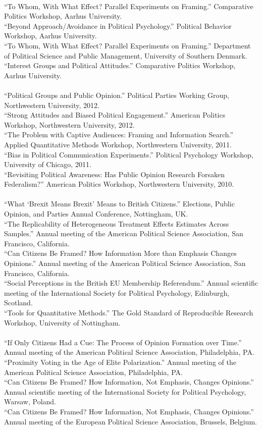 \documentclass[12pt]{article}
\newcommand{\topic}[1]{\pagebreak[3]\indent {\color{lg}{\footnotesize #1 }}\\}
\newcommand{\entry}[1]{\indent {\color{lg}\guillemotright}\hspace{2pt}#1\vspace{.25em}\\}
\begin{document}
{	\topic{Invited Presentations (2013)}
	\entry{``To Whom, With What Effect? Parallel Experiments on Framing.'' Comparative Politics Workshop, Aarhus University.}
	\entry{``Beyond Approach/Avoidance in Political Psychology.'' Political Behavior Workshop, Aarhus University.}
	\entry{``To Whom, With What Effect? Parallel Experiments on Framing.'' Department of Political Science and Public Management, University of Southern Denmark.}
	\entry{``Interest Groups and Political Attitudes.'' Comparative Politics Workshop, Aarhus University.}
	
	\topic{Invited Presentations (2012 and earlier)}
	\entry{``Political Groups and Public Opinion.'' Political Parties Working Group, Northwestern University, 2012.}
	\entry{``Strong Attitudes and Biased Political Engagement.'' American Politics Workshop, Northwestern University, 2012.}
	\entry{``The Problem with Captive Audiences: Framing and Information Search.'' Applied Quantitative Methods Workshop, Northwestern University, 2011.}
	\entry{``Bias in Political Communication Experiments.'' Political Psychology Workshop, University of Chicago, 2011.}
	\entry{``Revisiting Political Awareness: Has Public Opinion Research Forsaken Federalism?'' American Politics Workshop, Northwestern University, 2010.}

	\topic{Conference Papers (2017)}
    \entry{``What `Brexit Means Brexit' Means to British Citizens.'' Elections, Public Opinion, and Parties Annual Conference, Nottingham, UK.}
	\entry{``The Replicability of Heterogeneous Treatment Effects Estimates Across Samples.'' Annual meeting of the American Political Science Association, San Francisco, California.}
    \entry{``Can Citizens Be Framed? How Information More than Emphasis Changes Opinions.'' Annual meeting of the American Political Science Association, San Francisco, California.}
    \entry{``Social Perceptions in the British EU Membership Referendum.'' Annual scientific meeting of the International Society for Political Psychology, Edinburgh, Scotland.}
    \entry{``Tools for Quantitative Methods.'' The Gold Standard of Reproducible Research Workshop, University of Nottingham.}
	
    \topic{Conference Papers (2016)}
	\entry{``If Only Citizens Had a Cue: The Process of Opinion Formation over Time.'' Annual meeting of the American Political Science Association, Philadelphia, PA.}
	\entry{``Proximity Voting in the Age of Elite Polarization.'' Annual meeting of the American Political Science Association, Philadelphia, PA.}
	\entry{``Can Citizens Be Framed? How Information, Not Emphasis, Changes Opinions.'' Annual scientific meeting of the International Society for Political Psychology, Warsaw, Poland.}
	\entry{``Can Citizens Be Framed? How Information, Not Emphasis, Changes Opinions.'' Annual meeting of the European Political Science Association, Brussels, Belgium.}
	
}
\end{document}
